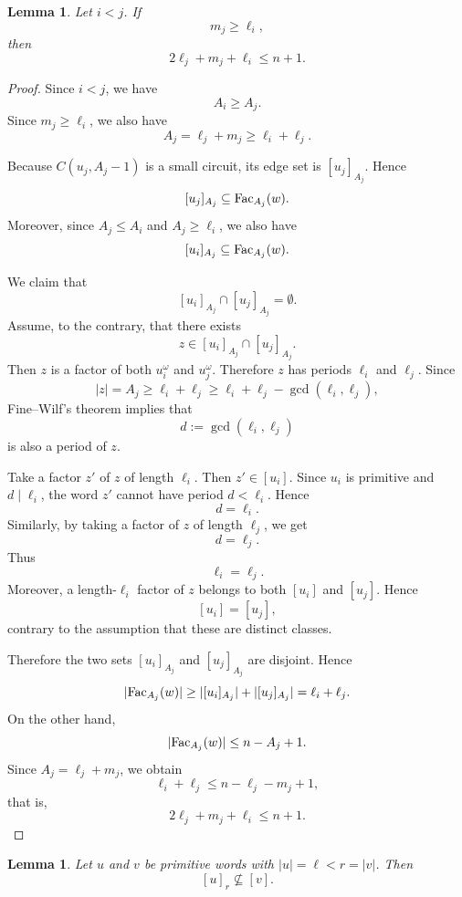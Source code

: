 \documentclass[runningheads,envcountsame,a4paper]{llncs}
\newtheorem{lem}[thm]{Lemma}
\newcommand{\fac}{\hbox{\rm Fac}}
\begin{document}
\begin{lem}\label{lem:pairwise-A}
Let \(i<j\). If
\[
        m_j\ge \ell_i,
\]
then
\[
        2\ell_j+m_j+\ell_i\le n+1.
\]
\end{lem}

\begin{proof}
Since \(i<j\), we have
\[
        A_i\ge A_j.
\]
Since \(m_j\ge \ell_i\), we also have
\[
        A_j=\ell_j+m_j\ge \ell_i+\ell_j.
\]

Because \(C(u_j,A_j-1)\) is a small circuit, its edge set is
\([u_j]_{A_j}\). Hence
\[
        [u_j]_{A_j}\subseteq \fac_{A_j}(w).
\]
Moreover, since \(A_j\le A_i\) and \(A_j\ge \ell_i\), we also have
\[
        [u_i]_{A_j}\subseteq \fac_{A_j}(w).
\]

We claim that
\[
        [u_i]_{A_j}\cap [u_j]_{A_j}=\emptyset .
\]
Assume, to the contrary, that there exists
\[
        z\in [u_i]_{A_j}\cap [u_j]_{A_j}.
\]
Then \(z\) is a factor of both \(u_i^\omega\) and \(u_j^\omega\). Therefore \(z\)
has periods \(\ell_i\) and \(\ell_j\). Since
\[
        |z|=A_j\ge \ell_i+\ell_j
        \ge
        \ell_i+\ell_j-\gcd(\ell_i,\ell_j),
\]
Fine--Wilf's theorem implies that
\[
        d:=\gcd(\ell_i,\ell_j)
\]
is also a period of \(z\).

Take a factor \(z'\) of \(z\) of length \(\ell_i\). Then \(z'\in [u_i]\).
Since \(u_i\) is primitive and \(d\mid \ell_i\), the word \(z'\) cannot have
period \(d<\ell_i\). Hence
\[
        d=\ell_i.
\]
Similarly, by taking a factor of \(z\) of length \(\ell_j\), we get
\[
        d=\ell_j.
\]
Thus
\[
        \ell_i=\ell_j.
\]
Moreover, a length-\(\ell_i\) factor of \(z\) belongs to both \([u_i]\) and
\([u_j]\). Hence
\[
        [u_i]=[u_j],
\]
contrary to the assumption that these are distinct classes.

Therefore the two sets \([u_i]_{A_j}\) and \([u_j]_{A_j}\) are disjoint. Hence
\[
        |\fac_{A_j}(w)|
        \ge
        |[u_i]_{A_j}|+|[u_j]_{A_j}|
        =
        \ell_i+\ell_j.
\]
On the other hand,
\[
        |\fac_{A_j}(w)|\le n-A_j+1.
\]
Since \(A_j=\ell_j+m_j\), we obtain
\[
        \ell_i+\ell_j\le n-\ell_j-m_j+1,
\]
that is,
\[
        2\ell_j+m_j+\ell_i\le n+1.
\]
\end{proof}

\begin{lem}\label{lem:periodic-window-not-contained}
Let \(u\) and \(v\) be primitive words with \(|u|=\ell<r=|v|\). Then
\[
        [u]_r\nsubseteq [v].
\]
\end{lem}
\end{document}
